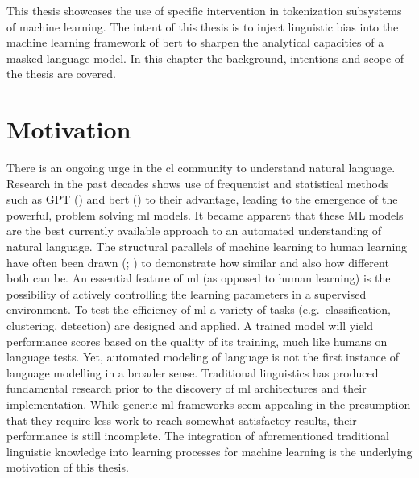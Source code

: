 
This thesis showcases the use of specific intervention in tokenization subsystems of machine learning.
The intent of this thesis is to inject linguistic bias into the machine learning framework of \ac{bert} to sharpen the analytical capacities of a masked language model.
In this chapter the background, intentions and scope of the thesis are covered.


\section{Motivation}
\label{sec:motivation}
There is an ongoing urge in the \acf{cl} community to understand natural language.
Research in the past decades shows use of frequentist and statistical methods such as \ac{GPT} (\cite{gpt}) and \ac{bert} (\cite{ATTENTION}) to their advantage, leading to the emergence of the powerful, problem solving \ac{ml} models.
It became apparent that these ML models are the best currently available approach to an automated understanding of natural language.
The structural parallels of machine learning to human learning have often been drawn (\citeauthor{humanmachinelearning1}; \cite{humanmachinelearning2}) to demonstrate how similar and also how different both can be.
An essential feature of \ac{ml} (as opposed to human learning) is the possibility of actively controlling the learning parameters in a supervised environment.
To test the efficiency of  \ac{ml} a variety of tasks (e.g.\ classification, clustering, detection) are designed and applied.
A trained model will yield performance scores based on the quality of its training, much like humans on language tests.
Yet, automated modeling of language is not the first instance of language modelling in a broader sense.
Traditional linguistics has produced fundamental research prior to the discovery of \ac{ml} architectures and their implementation.
While generic \ac{ml} frameworks seem appealing in the presumption that they require less work to reach somewhat satisfactoy results,
their performance is still incomplete.
The integration of aforementioned traditional linguistic knowledge into learning processes for machine learning is the underlying motivation of this thesis.

